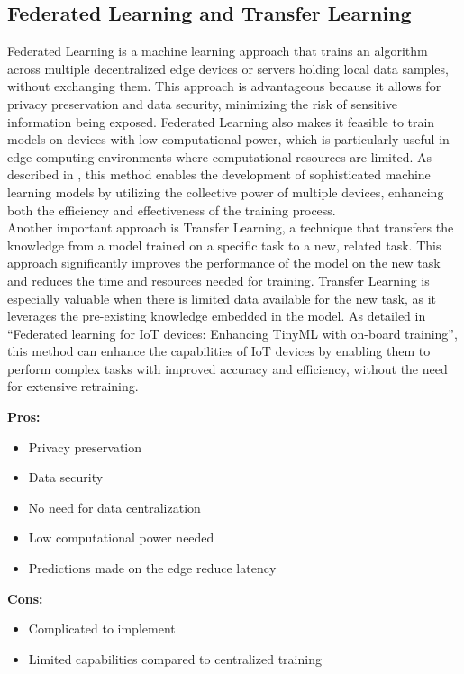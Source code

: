 \subsection*{Federated Learning and Transfer Learning}
Federated Learning is a machine learning approach that trains an algorithm across multiple decentralized edge devices or servers holding local data samples, without exchanging them. This approach is advantageous because it allows for privacy preservation and data security, minimizing the risk of sensitive information being exposed. Federated Learning also makes it feasible to train models on devices with low computational power, which is particularly useful in edge computing environments where computational resources are limited. As described in \cite{9260194}, this method enables the development of sophisticated machine learning models by utilizing the collective power of multiple devices, enhancing both the efficiency and effectiveness of the training process.
\\
Another important approach is Transfer Learning, a technique that transfers the knowledge from a model trained on a specific task to a new, related task. This approach significantly improves the performance of the model on the new task and reduces the time and resources needed for training. Transfer Learning is especially valuable when there is limited data available for the new task, as it leverages the pre-existing knowledge embedded in the model. As detailed in \enquote{Federated learning for IoT devices: Enhancing TinyML with on-board training}\cite{FICCO2024102189}, this method can enhance the capabilities of IoT devices by enabling them to perform complex tasks with improved accuracy and efficiency, without the need for extensive retraining.

\textbf{Pros:}
\begin{itemize}
    \item Privacy preservation
    \item Data security
    \item No need for data centralization
    \item Low computational power needed
    \item Predictions made on the edge reduce latency
\end{itemize}
\textbf{Cons:}
\begin{itemize}
    \item Complicated to implement
    \item Limited capabilities compared to centralized training
\end{itemize}


